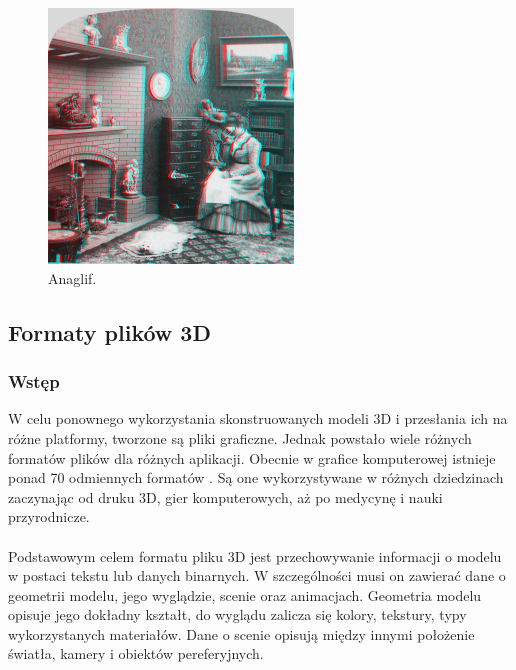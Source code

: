 \begin{figure}[H]
		\centering
 		\includegraphics[width=6.5cm]{anaglif.jpg}
    	\caption{Anaglif.}
 		\label{rys4}
\end{figure}

\newpage
\subsection{Formaty plików 3D}
\subsubsection{Wstęp}
W celu ponownego wykorzystania skonstruowanych modeli 3D i przesłania ich na różne platformy, tworzone są pliki graficzne. Jednak powstało wiele różnych formatów plików dla różnych aplikacji. Obecnie w grafice komputerowej istnieje ponad 70 odmiennych formatów%
. Są one wykorzystywane w różnych dziedzinach zaczynając od druku 3D, gier komputerowych, aż po medycynę i nauki przyrodnicze. 
\paragraph{}Podstawowym celem formatu pliku 3D jest przechowywanie informacji o modelu w postaci tekstu lub danych binarnych. W szczególności musi on zawierać dane o geometrii modelu, jego wyglądzie, scenie oraz animacjach. Geometria modelu opisuje jego dokładny kształt, do wyglądu zalicza się kolory, tekstury, typy wykorzystanych materiałów. Dane o scenie opisują między innymi położenie światła, kamery i obiektów pereferyjnych. 
